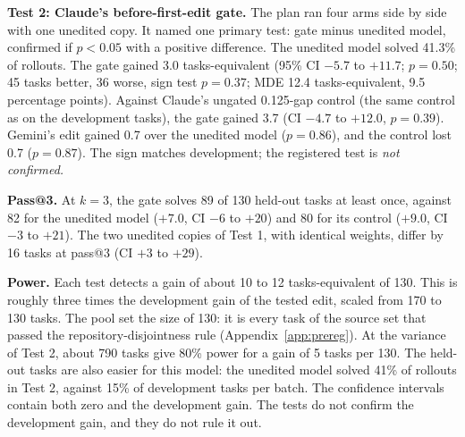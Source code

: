 \textbf{Test 2: Claude's before-first-edit gate.} The plan ran four arms side by side with one unedited copy. It named one primary test: gate minus unedited model, confirmed if $p < 0.05$ with a positive difference. The unedited model solved 41.3\% of rollouts. The gate gained 3.0 tasks-equivalent (95\% CI $-5.7$ to $+11.7$; $p = 0.50$; 45 tasks better, 36 worse, sign test $p = 0.37$; MDE 12.4 tasks-equivalent, 9.5 percentage points). Against Claude's ungated 0.125-gap control (the same control as on the development tasks), the gate gained 3.7 (CI $-4.7$ to $+12.0$, $p = 0.39$). Gemini's edit gained 0.7 over the unedited model ($p = 0.86$), and the control lost 0.7 ($p = 0.87$). The sign matches development; the registered test is \emph{not confirmed.}

\textbf{Pass@3.} At $k = 3$, the gate solves 89 of 130 held-out tasks at least once, against 82 for the unedited model ($+7.0$, CI $-6$ to $+20$) and 80 for its control ($+9.0$, CI $-3$ to $+21$). The two unedited copies of Test 1, with identical weights, differ by 16 tasks at pass@3 (CI $+3$ to $+29$).

\textbf{Power.} Each test detects a gain of about 10 to 12 tasks-equivalent of 130. This is roughly three times the development gain of the tested edit, scaled from 170 to 130 tasks. The pool set the size of 130: it is every task of the source set that passed the repository-disjointness rule (Appendix~\ref{app:prereg}). At the variance of Test 2, about 790 tasks give 80\% power for a gain of 5 tasks per 130. The held-out tasks are also easier for this model: the unedited model solved 41\% of rollouts in Test 2, against 15\% of development tasks per batch. The confidence intervals contain both zero and the development gain. The tests do not confirm the development gain, and they do not rule it out.
